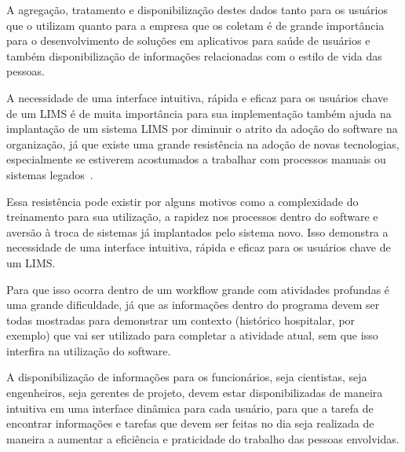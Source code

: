 


A agregação, tratamento e disponibilização destes dados tanto para os usuários que o utilizam quanto para a empresa que os coletam é de grande importância para o desenvolvimento de soluções em aplicativos para saúde de usuários e também disponibilização de informações relacionadas com o estilo de vida das pessoas.


A necessidade de uma interface intuitiva, rápida e eficaz para os usuários chave de um LIMS é de muita importância para sua implementação também ajuda na implantação de um sistema LIMS por diminuir o atrito da adoção do software na organização, já que existe uma grande resistência na adoção de novas tecnologias, especialmente se estiverem acostumados a trabalhar com processos manuais ou sistemas legados~\cite{2018CommonAstrix}.

Essa resistência pode existir por alguns motivos como a complexidade do treinamento para sua utilização,  a rapidez nos processos dentro do software e aversão à troca de sistemas já implantados pelo sistema novo. Isso demonstra a necessidade de uma interface intuitiva, rápida e eficaz para os usuários chave de um LIMS.

Para que isso ocorra dentro de um workflow grande com atividades profundas é uma grande dificuldade, já que as informações dentro do programa devem ser todas mostradas para demonstrar um contexto (histórico hospitalar, por exemplo) que vai ser utilizado para completar a atividade atual, sem que isso interfira na utilização do software.


A disponibilização de informações para os funcionários, seja cientistas, seja engenheiros, seja gerentes de projeto, devem estar disponibilizadas de maneira intuitiva em uma interface dinâmica para cada usuário, para que a tarefa de encontrar informações e tarefas que devem ser feitas no dia seja realizada de maneira a aumentar a eficiência e praticidade do trabalho das pessoas envolvidas.